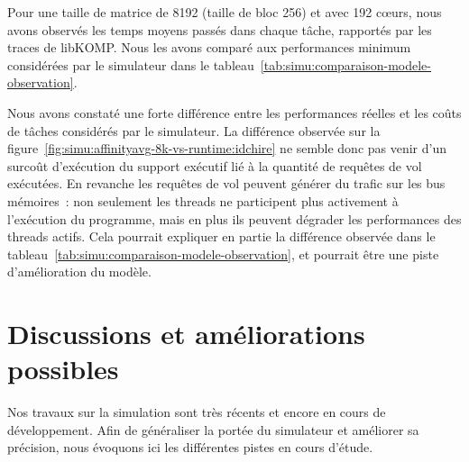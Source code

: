 Pour une taille de matrice de 8192 (taille de bloc 256) et avec 192 cœurs, nous avons observés les temps moyens passés dans chaque tâche, rapportés par les traces de libKOMP.
Nous les avons comparé aux performances minimum considérées par le simulateur dans le tableau~\ref{tab:simu:comparaison-modele-observation}.

Nous avons constaté une forte différence entre les performances réelles et les coûts de tâches considérés par le simulateur.
La différence observée sur la figure~\ref{fig:simu:affinityavg-8k-vs-runtime:idchire} ne semble donc pas venir d'un surcoût d'exécution du support exécutif lié à la quantité de requêtes de vol exécutées.
En revanche les requêtes de vol peuvent générer du trafic sur les bus mémoires~: non seulement les threads ne participent plus activement à l'exécution du programme, mais en plus ils peuvent dégrader les performances des threads actifs.
Cela pourrait expliquer en partie la différence observée dans le tableau~\ref{tab:simu:comparaison-modele-observation}, et pourrait être une piste d'amélioration du modèle.








\section{Discussions et améliorations possibles}\label{sec:simulation:next}

Nos travaux sur la simulation sont très récents et encore en cours de développement.
Afin de généraliser la portée du simulateur et améliorer sa précision, nous évoquons ici les différentes pistes en cours d'étude.

